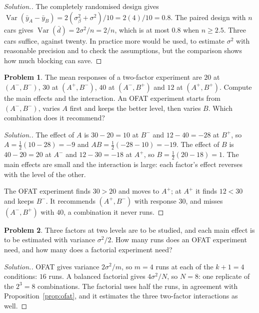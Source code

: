 \documentclass[11pt,a4paper]{article}
\numberwithin{equation}{section}
\DeclareMathOperator{\Var}{Var}
\theoremstyle{definition}
\newtheorem{problemx}{Problem}[subsection]
\newenvironment{problem}{\begin{problemx}}{\end{problemx}}
\newenvironment{solution}
  {\renewcommand{\qedsymbol}{}\begin{proof}[\textit{Solution}.]}
  {\end{proof}}
\begin{document}
\begin{solution}
The completely randomised design gives $\Var(\bar y_A - \bar y_B) = 2(\sigma_\beta^2 + \sigma^2)/10 = 2(4)/10 = 0.8$. The paired design with $n$ cars gives
$\Var(\bar d) = 2\sigma^2/n = 2/n$, which is at most $0.8$ when $n \ge 2.5$. Three cars suffice, against twenty. In practice more would be used, to estimate
$\sigma^2$ with reasonable precision and to check the assumptions, but the comparison shows how much blocking can save.
\end{solution}

\begin{problem}
The mean responses of a two-factor experiment are $20$ at $(A^-, B^-)$, $30$ at $(A^+, B^-)$, $40$ at $(A^-, B^+)$ and $12$ at $(A^+, B^+)$. Compute the
main effects and the interaction. An OFAT experiment starts from $(A^-, B^-)$, varies $A$ first and keeps the better level, then varies $B$. Which
combination does it recommend?
\end{problem}

\begin{solution}
The effect of $A$ is $30 - 20 = 10$ at $B^-$ and $12 - 40 = -28$ at $B^+$, so $A = \frac12(10 - 28) = -9$ and $AB = \frac12(-28 - 10) = -19$. The effect of $B$ is
$40 - 20 = 20$ at $A^-$ and $12 - 30 = -18$ at $A^+$, so $B = \frac12(20 - 18) = 1$. The main effects are small and the interaction is large: each factor's
effect reverses with the level of the other.

The OFAT experiment finds $30 > 20$ and moves to $A^+$; at $A^+$ it finds $12 < 30$ and keeps $B^-$. It recommends $(A^+, B^-)$ with response $30$, and misses
$(A^-, B^+)$ with $40$, a combination it never runs.
\end{solution}

\begin{problem}
Three factors at two levels are to be studied, and each main effect is to be estimated with variance $\sigma^2/2$. How many runs does an OFAT
experiment need, and how many does a factorial experiment need?
\end{problem}

\begin{solution}
OFAT gives variance $2\sigma^2/m$, so $m = 4$ runs at each of the $k + 1 = 4$ conditions: $16$ runs. A balanced factorial gives $4\sigma^2/N$, so $N = 8$: one
replicate of the $2^3 = 8$ combinations. The factorial uses half the runs, in agreement with Proposition~\ref{prop:ofat}, and it estimates the three
two-factor interactions as well.
\end{solution}
\end{document}
